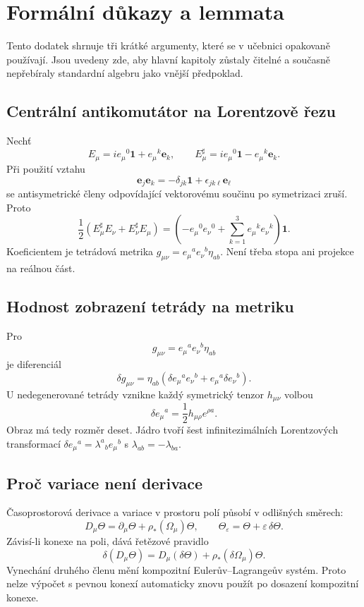 
\chapter{Formální důkazy a lemmata}

Tento dodatek shrnuje tři krátké argumenty, které se v učebnici opakovaně
používají. Jsou uvedeny zde, aby hlavní kapitoly zůstaly čitelné a současně
nepřebíraly standardní algebru jako vnější předpoklad.

\section{Centrální antikomutátor na Lorentzově řezu}
Nechť
\[
 E_\mu=i e_\mu{}^0\mathbf1+e_\mu{}^k\mathbf e_k,
 \qquad
 E_\mu^\sharp=i e_\mu{}^0\mathbf1-e_\mu{}^k\mathbf e_k.
\]
Při použití vztahu
\[
 \mathbf e_j\mathbf e_k=-\delta_{jk}\mathbf1
 +\epsilon_{jk\ell}\mathbf e_\ell
\]
se antisymetrické členy odpovídající vektorovému součinu po symetrizaci
zruší. Proto
\[
 \frac12\left(E_\mu^\sharp E_\nu+E_\nu^\sharp E_\mu\right)
 =\left(-e_\mu{}^0e_\nu{}^0+\sum_{k=1}^3e_\mu{}^ke_\nu{}^k\right)\mathbf1.
\]
Koeficientem je tetrádová metrika
$g_{\mu\nu}=e_\mu{}^ae_\nu{}^b\eta_{ab}$. Není třeba stopa ani projekce
na reálnou část.

\section{Hodnost zobrazení tetrády na metriku}
Pro
\[
 g_{\mu\nu}=e_\mu{}^ae_\nu{}^b\eta_{ab}
\]
je diferenciál
\[
 \delta g_{\mu\nu}
 =\eta_{ab}\left(\delta e_\mu{}^a e_\nu{}^b
 +e_\mu{}^a\delta e_\nu{}^b\right).
\]
U nedegenerované tetrády vznikne každý symetrický tenzor $h_{\mu\nu}$ volbou
\[
 \delta e_\mu{}^a=\frac12h_{\mu\rho}e^{\rho a}.
\]
Obraz má tedy rozměr deset. Jádro tvoří šest infinitezimálních
Lorentzových transformací
$\delta e_\mu{}^a=\lambda^a{}_b e_\mu{}^b$ s
$\lambda_{ab}=-\lambda_{ba}$.

\section{Proč variace není derivace}
Časoprostorová derivace a variace v prostoru polí působí v odlišných
směrech:
\[
 D_\mu\Theta=\partial_\mu\Theta+\rho_*(\Omega_\mu)\Theta,
 \qquad
 \Theta_\varepsilon=\Theta+\varepsilon\,\delta\Theta.
\]
Závisí-li konexe na poli, dává řetězové pravidlo
\[
 \delta(D_\mu\Theta)
 =D_\mu(\delta\Theta)+\rho_*(\delta\Omega_\mu)\Theta.
\]
Vynechání druhého členu mění kompozitní Eulerův--Lagrangeův systém.
Proto nelze výpočet s pevnou konexí automaticky znovu použít po dosazení
kompozitní konexe.

